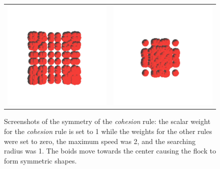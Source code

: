 \begin{figure}[htbp]
\begin{center}
\begin{tabular}{cc}
\includegraphics[scale= 0.5]{figures/coh3.pdf} &
\includegraphics[scale= 0.5]{figures/coh4.pdf}
\end{tabular}
\end{center}
\caption{Screenshots of the symmetry of the \textit{cohesion} rule: the scalar weight for the \textit{cohesion} rule is set to 1 while the weights for the other rules were set to zero, the maximum speed was 2, and the searching radius was 1. The boids move towards the center causing the flock to form symmetric shapes.}
\label{cohRule}
\end{figure}

